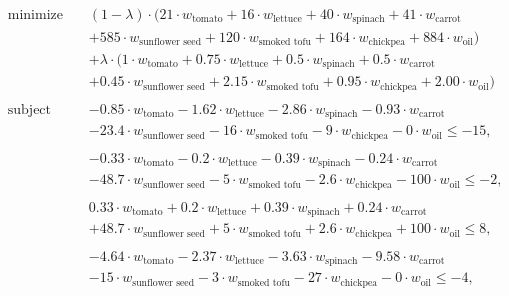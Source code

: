 \documentclass[../main.tex]{subfiles}
\begin{document}
\begin{enumerate}[i.]
	\begin{equation*}
		\begin{aligned}
			& \text{minimize} & & (1 - \lambda) \cdot (21 \cdot w_{\text{tomato}} + 16 \cdot  w_{\text{lettuce}} + 40 \cdot w_{\text{spinach}} + 41 \cdot w_{\text{carrot}} \\
			& & & + 585 \cdot w_{\text{sunflower seed}} + 120 \cdot w_{\text{smoked tofu}} + 164 \cdot w_{\text{chickpea}} + 884 \cdot w_{\text{oil}} )\\ 
			& & & + \lambda \cdot (1 \cdot w_{\text{tomato}} + 0.75 \cdot  w_{\text{lettuce}} + 0.5 \cdot w_{\text{spinach}} + 0.5 \cdot w_{\text{carrot}} \\
			& & & + 0.45 \cdot w_{\text{sunflower seed}} + 2.15 \cdot w_{\text{smoked tofu}} + 0.95 \cdot w_{\text{chickpea}} + 2.00 \cdot w_{\text{oil}} )\\ \\
			& \text{subject to} & & -0.85 \cdot w_{\text{tomato}} - 1.62 \cdot  w_{\text{lettuce}} - 2.86 \cdot w_{\text{spinach}} - 0.93 \cdot w_{\text{carrot}} \\
			& & & - 23.4 \cdot w_{\text{sunflower seed}} - 16 \cdot w_{\text{smoked tofu}} - 9 \cdot w_{\text{chickpea}} - 0 \cdot w_{\text{oil}} \leq -15, \\ \\
			& & & - 0.33 \cdot w_{\text{tomato}} - 0.2 \cdot  w_{\text{lettuce}} - 0.39 \cdot w_{\text{spinach}} - 0.24  \cdot w_{\text{carrot}} \\
			& & & - 48.7 \cdot w_{\text{sunflower seed}} - 5 \cdot w_{\text{smoked tofu}} - 2.6 \cdot w_{\text{chickpea}} - 100 \cdot w_{\text{oil}} \leq -2, \\ \\
			& & & 0.33 \cdot w_{\text{tomato}} + 0.2 \cdot  w_{\text{lettuce}} + 0.39 \cdot w_{\text{spinach}} + 0.24  \cdot w_{\text{carrot}} \\
			& & & + 48.7 \cdot w_{\text{sunflower seed}} + 5 \cdot w_{\text{smoked tofu}} + 2.6 \cdot w_{\text{chickpea}} + 100 \cdot w_{\text{oil}} \leq 8, \\ \\
			& & & - 4.64 \cdot w_{\text{tomato}} - 2.37 \cdot  w_{\text{lettuce}} - 3.63 \cdot w_{\text{spinach}} - 9.58  \cdot w_{\text{carrot}} \\
			& & & - 15 \cdot w_{\text{sunflower seed}} - 3 \cdot w_{\text{smoked tofu}} - 27 \cdot w_{\text{chickpea}} - 0 \cdot w_{\text{oil}} \leq -4, \\ \\

\end{aligned}
\end{equation*}
\end{enumerate}
\end{document}

